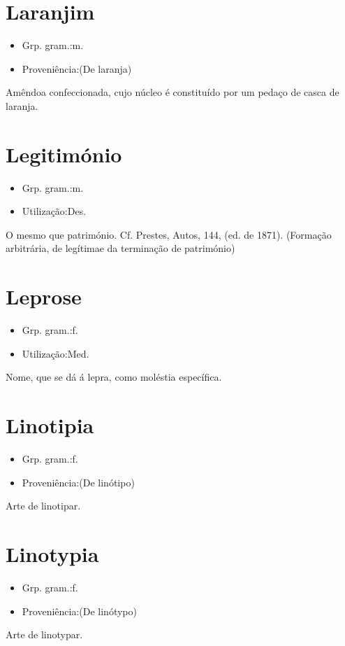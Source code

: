 \section{Laranjim}
\begin{itemize}
\item {Grp. gram.:m.}
\end{itemize}
\begin{itemize}
\item {Proveniência:(De \textunderscore laranja\textunderscore )}
\end{itemize}
Amêndoa confeccionada, cujo núcleo é constituído por um pedaço de casca de laranja.
\section{Legitimónio}
\begin{itemize}
\item {Grp. gram.:m.}
\end{itemize}
\begin{itemize}
\item {Utilização:Des.}
\end{itemize}
O mesmo que \textunderscore património\textunderscore . Cf. Prestes, \textunderscore Autos\textunderscore , 144, (ed. de 1871).
(Formação arbitrária, de \textunderscore legítima\textunderscore  e da terminação de \textunderscore património\textunderscore )
\section{Leprose}
\begin{itemize}
\item {Grp. gram.:f.}
\end{itemize}
\begin{itemize}
\item {Utilização:Med.}
\end{itemize}
Nome, que se dá á lepra, como moléstia específica.
\section{Linotipia}
\begin{itemize}
\item {Grp. gram.:f.}
\end{itemize}
\begin{itemize}
\item {Proveniência:(De \textunderscore linótipo\textunderscore )}
\end{itemize}
Arte de linotipar.
\section{Linotypia}
\begin{itemize}
\item {Grp. gram.:f.}
\end{itemize}
\begin{itemize}
\item {Proveniência:(De \textunderscore linótypo\textunderscore )}
\end{itemize}
Arte de linotypar.
